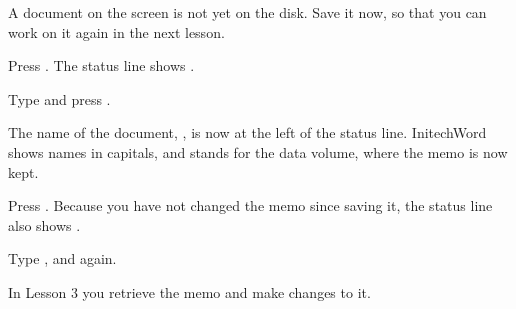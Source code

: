 A document on the screen is not yet on the disk.  Save it now, so that you
can work on it again in the next lesson.
\begin{WPSteps}
\item Press .  The status line shows
.
\item Type  and press .
\end{WPSteps}
The name of the document, , is now at the left of the
status line.  InitechWord shows names in capitals, and  stands for
the data volume, where the memo is now kept.

\begin{WPSteps}
\item Press .  Because you have not changed the memo since
saving it, the status line also shows .
\item Type , and  again.
\end{WPSteps}
\EndReplay
In Lesson 3 you retrieve the memo and make changes to it.
